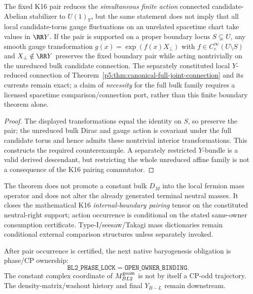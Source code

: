\documentclass[12pt,a4paper]{article}
\begin{document}
\begin{proposition}
\label{p5:prop:v270-boundary-bulk-torus-firewall}
The fixed K16 pair reduces the \emph{simultaneous finite action}
connected candidate-Abelian stabilizer to \(U(1)_Y\), but the same
statement does not imply that all local candidate-torus gauge
fluctuations on an unrelated spacetime chart take values in
\(\RR Y\). If the pair is supported on a proper boundary locus
\(S\subsetneq U\), any smooth gauge transformation
\(g(x)=\exp(f(x)X_\perp)\) with
\(f\in C_c^\infty(U\setminus S)\) and
\(X_\perp\notin\RR Y\) preserves the fixed boundary pair while acting
nontrivially on the unreduced bulk candidate connection. The separately
constituted local \(Y\)-reduced connection of
Theorem~\ref{p5:thm:canonical-full-joint-connection} and its currents
remain exact; a claim of \emph{necessity} for the full bulk family
requires a licensed spacetime comparison/connection port, rather than
this finite boundary theorem alone.
\end{proposition}
\begin{proof}
The displayed transformations equal the identity on \(S\), so preserve
the pair; the unreduced bulk Dirac and gauge action is covariant under
the full candidate torus and hence admits these nontrivial interior
transformations. This constructs the required counterexample. A
separately restricted \(Y\)-bundle is a valid derived descendant,
but restricting the whole unreduced affine family is not a consequence
of the K16 pairing commutator.
\end{proof}

\begin{remark}
\label{p5:rem:v3105-boundary-not-terminal-majorana}
The theorem does not promote a constant bulk $D_M$ into the local fermion mass
operator and does not alter the already generated terminal neutral masses.
It closes the mathematical K16 \emph{internal-boundary pairing} tensor
on the constituted neutral-right support; action occurrence is conditional
on the stated same-owner consumption certificate.  Type-I/seesaw/Takagi mass dictionaries
remain conditional external comparison structures unless separately invoked.
\end{remark}

\begin{corollary}
\label{p5:cor:v3105-bl2-new-frontier}
After pair occurrence is certified, the next native baryogenesis obligation is
phase/CP ownership:
\[
 \boxed{
 \texttt{BL2\_PHASE\_LOCK}=\texttt{OPEN\_OWNER\_BINDING}.}
\]
The constant complex coordinate of $M_{BL2}^{\rm geom}$ is not by itself a
CP-odd trajectory.  The density-matrix/washout history and final $Y_{B-L}$
remain downstream.
\end{corollary}
\end{document}
